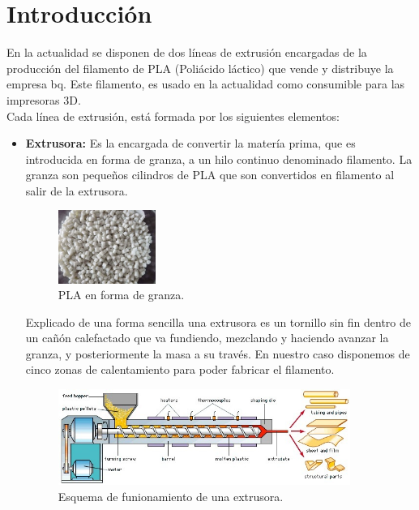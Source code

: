 \chapter{Introducción}
\label{introduccion}

En la actualidad se disponen de dos líneas de extrusión encargadas de la producción del filamento de PLA (Poliácido láctico) que vende y distribuye la empresa bq. Este filamento, es usado en la actualidad como consumible para las impresoras 3D.\\

Cada línea de extrusión, está formada por los siguientes elementos:

\begin{itemize}
    \item \textbf{Extrusora:} Es la encargada de convertir la matería prima, que es introducida en forma de granza, a un hilo continuo denominado filamento. La granza son pequeños cilindros de PLA que son convertidos en filamento al salir de la extrusora.\\
    \begin{figure}[H]
    	\centering
    	\includegraphics[width=0.3\textwidth]{images/PLA-Pellets.jpg}
    	\caption{PLA en forma de granza.}
    	\label{fig:intro_pellets}
	\end{figure}
    Explicado de una forma sencilla una extrusora es un tornillo sin fin dentro de un cañón calefactado que va fundiendo, mezclando y haciendo avanzar la granza, y posteriormente la masa a su través. En nuestro caso disponemos de cinco zonas de calentamiento para poder fabricar el filamento.\\
    \begin{figure}[H]
    	\centering
    	\includegraphics[width=0.9\textwidth]{images/Extruder.jpg}
    	\caption{Esquema de funionamiento de una extrusora.}

\end{figure}
\end{itemize}
